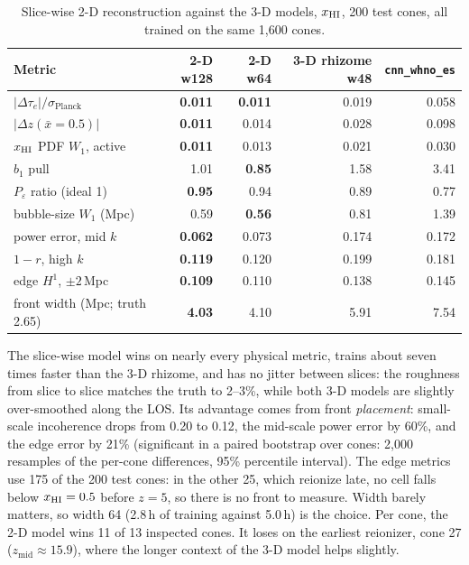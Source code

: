 \begin{table}[!tp]
  \centering
  \caption{Slice-wise 2-D reconstruction against the 3-D models, $x_{\mathrm{HI}}$, 200 test cones, all trained on the same 1,600 cones.}
  \label{tab:results-slicewise}
  \small
  \begin{tabular}{@{}lrrrr@{}}
    \toprule
    Metric & 2-D w128 & \textbf{2-D w64} & 3-D rhizome w48 & \texttt{cnn\_whno\_es} \\
    \midrule
    $|\Delta\tau_e|/\sigma_{\mathrm{Planck}}$ & \textbf{0.011} & \textbf{0.011} & 0.019 & 0.058 \\
    $|\Delta z(\bar x=0.5)|$ & \textbf{0.011} & 0.014 & 0.028 & 0.098 \\
    $x_{\mathrm{HI}}$ PDF $W_1$, active & \textbf{0.011} & 0.013 & 0.021 & 0.030 \\
    $b_1$ pull & 1.01 & \textbf{0.85} & 1.58 & 3.41 \\
    $P_\varepsilon$ ratio (ideal 1) & \textbf{0.95} & 0.94 & 0.89 & 0.77 \\
    bubble-size $W_1$ (Mpc) & 0.59 & \textbf{0.56} & 0.81 & 1.39 \\
    power error, mid $k$ & \textbf{0.062} & 0.073 & 0.174 & 0.172 \\
    $1-r$, high $k$ & \textbf{0.119} & 0.120 & 0.199 & 0.181 \\
    edge $H^1$, $\pm2$\,Mpc & \textbf{0.109} & 0.110 & 0.138 & 0.145 \\
    front width (Mpc; truth 2.65) & \textbf{4.03} & 4.10 & 5.91 & 7.54 \\
    \bottomrule
  \end{tabular}
\end{table}

The slice-wise model wins on nearly every physical metric, trains about seven times faster than the 3-D rhizome, and has no jitter between slices: the roughness from slice to slice matches the truth to 2--3\%, while both 3-D models are slightly over-smoothed along the LOS. Its advantage comes from front \emph{placement}: small-scale incoherence drops from 0.20 to 0.12, the mid-scale power error by 60\%, and the edge error by 21\% (significant in a paired bootstrap over cones: 2,000 resamples of the per-cone differences, 95\% percentile interval). The edge metrics use 175 of the 200 test cones: in the other 25, which reionize late, no cell falls below $x_{\mathrm{HI}}=0.5$ before $z=5$, so there is no front to measure. Width barely matters, so width 64 (2.8\,h of training against 5.0\,h) is the choice. Per cone, the 2-D model wins 11 of 13 inspected cones. It loses on the earliest reionizer, cone 27 ($z_{\mathrm{mid}}\approx15.9$), where the longer context of the 3-D model helps slightly.

